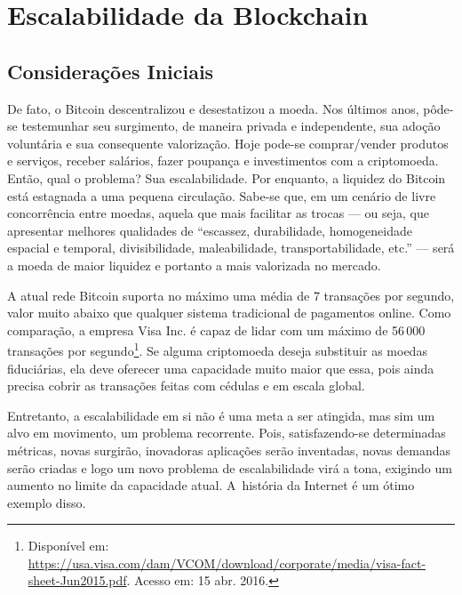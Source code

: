 \chapter{Escalabilidade da Blockchain}
\label{ch:escalabilidade}

\section{Considerações Iniciais}

De fato, o Bitcoin descentralizou e desestatizou a moeda. Nos últimos anos, pôde-se testemunhar seu surgimento, de maneira privada e independente, sua adoção voluntária e sua consequente valorização. Hoje pode-se comprar/vender produtos e serviços, receber salários, fazer poupança e investimentos com a criptomoeda. Então, qual o problema? Sua escalabilidade. Por enquanto, a liquidez do Bitcoin está estagnada a uma pequena circulação. Sabe-se que, em um cenário de livre concorrência entre moedas, aquela que mais facilitar as trocas --- ou seja, que apresentar melhores qualidades de ``escassez, durabilidade, homogeneidade espacial e temporal, divisibilidade, maleabilidade, transportabilidade, etc.'' --- será a moeda de maior liquidez e portanto a mais valorizada no mercado.

A atual rede Bitcoin suporta no máximo uma média de 7 transações por segundo, valor muito abaixo que qualquer sistema tradicional de pagamentos online. Como comparação, a empresa Visa Inc. é capaz de lidar com um máximo de 56\,000 transações por segundo\footnote{Disponível em: \url{https://usa.visa.com/dam/VCOM/download/corporate/media/visa-fact-sheet-Jun2015.pdf}. Acesso em: 15 abr. 2016.}. Se alguma criptomoeda deseja substituir as moedas fiduciárias, ela deve oferecer uma capacidade muito maior que essa, pois ainda precisa cobrir as transações feitas com cédulas e em escala global.

Entretanto, a escalabilidade em si não é uma meta a ser atingida, mas sim um alvo em movimento, um problema recorrente. Pois, satisfazendo-se determinadas métricas, novas surgirão, inovadoras aplicações serão inventadas, novas demandas serão criadas e logo um novo problema de escalabilidade virá a tona, exigindo um aumento no limite da capacidade atual. A~história da Internet é um ótimo exemplo disso.

